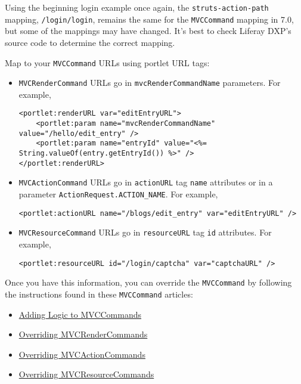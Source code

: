 Using the beginning login example once again, the
\texttt{struts-action-path} mapping, \texttt{/login/login}, remains the
same for the \texttt{MVCCommand} mapping in 7.0, but some of the
mappings may have changed. It's best to check Liferay DXP's source code
to determine the correct mapping.

Map to your \texttt{MVCCommand} URLs using portlet URL tags:

\begin{itemize}
\item
  \texttt{MVCRenderCommand} URLs go in \texttt{mvcRenderCommandName}
  parameters. For example,

\begin{verbatim}
<portlet:renderURL var="editEntryURL">
    <portlet:param name="mvcRenderCommandName" value="/hello/edit_entry" />
    <portlet:param name="entryId" value="<%= String.valueOf(entry.getEntryId()) %>" />
</portlet:renderURL>
\end{verbatim}
\item
  \texttt{MVCActionCommand} URLs go in \texttt{actionURL} tag
  \texttt{name} attributes or in a parameter
  \texttt{ActionRequest.ACTION\_NAME}. For example,

\begin{verbatim}
<portlet:actionURL name="/blogs/edit_entry" var="editEntryURL" />
\end{verbatim}
\item
  \texttt{MVCResourceCommand} URLs go in \texttt{resourceURL} tag
  \texttt{id} attributes. For example,

\begin{verbatim}
<portlet:resourceURL id="/login/captcha" var="captchaURL" />
\end{verbatim}
\end{itemize}

Once you have this information, you can override the \texttt{MVCCommand}
by following the instructions found in these \texttt{MVCCommand}
articles:

\begin{itemize}
\tightlist
\item
  \href{/docs/7-2/customization/-/knowledge_base/c/adding-logic-to-mvc-commands}{Adding
  Logic to MVCCommands}
\item
  \href{/docs/7-2/customization/-/knowledge_base/c/overriding-mvcrendercommand}{Overriding
  MVCRenderCommands}
\item
  \href{/docs/7-2/customization/-/knowledge_base/c/overriding-mvcactioncommand}{Overriding
  MVCActionCommands}
\item
  \href{/docs/7-2/customization/-/knowledge_base/c/overriding-mvcresourcecommand}{Overriding
  MVCResourceCommands}
\end{itemize}

